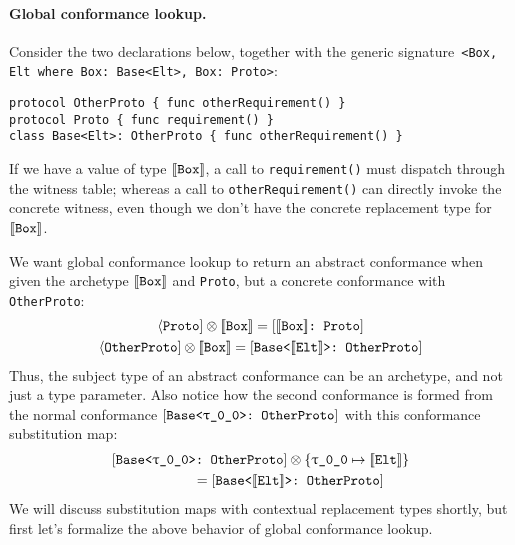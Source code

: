 \documentclass[../generics]{subfiles}
\begin{document}
\paragraph{Global conformance lookup.} Consider the two declarations below, together with the generic signature~\verb|<Box, Elt where Box: Base<Elt>, Box: Proto>|:
\begin{Verbatim}
protocol OtherProto { func otherRequirement() }
protocol Proto { func requirement() }
class Base<Elt>: OtherProto { func otherRequirement() }
\end{Verbatim}
If we have a value of type $[\![\texttt{Box}]\!]$, a call to \texttt{requirement()} must dispatch through the witness table; whereas a call to \texttt{otherRequirement()} can directly invoke the concrete witness, even though we don't have the concrete replacement type for $[\![\texttt{Box}]\!]$.

We want global conformance lookup to return an abstract conformance when given the archetype $[\![\texttt{Box}]\!]$ and \texttt{Proto}, but a concrete conformance with \texttt{OtherProto}:
\begin{gather*}
\Proto{Proto}\otimes \archetype{Box} = \ConfReq{$\archetype{Box}$}{Proto}\\
\Proto{OtherProto}\otimes \archetype{Box} = \ConfReq{Base<$\archetype{Elt}$>}{OtherProto}
\end{gather*}
Thus, the subject type of an abstract conformance can be an archetype, and not just a type parameter. Also notice how the second conformance is formed from the normal conformance $\ConfReq{Base<\rT>}{OtherProto}$ with this conformance substitution map:
\begin{gather*}
\ConfReq{Base<\rT>}{OtherProto}\otimes\SubstMap{\SubstType{\rT}{$\archetype{Elt}$}}\\
\qquad\qquad {} = \ConfReq{Base<$\archetype{Elt}$>}{OtherProto}
\end{gather*}
We will discuss substitution maps with contextual replacement types shortly, but first let's formalize the above behavior of global conformance lookup.
\end{document}
